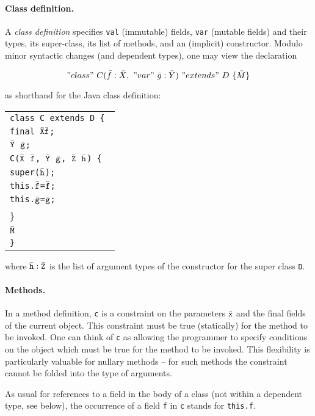 \documentclass[nocopyrightspace,preprint,10pt]{sigplanconf}
\begin{document}
\paragraph{Class definition.}

A {\em class definition} specifies {\tt val} (immutable) fields, {\tt var}
(mutable fields) and their types, its super-class, its list of
methods, and an (implicit) constructor. Modulo minor syntactic changes
(and dependent types), one may view the declaration

\[
"class"~C(\bar{f}:\bar{X},~"var"~\bar{g}:\bar{Y})~"extends"~D~\{\bar{M}\}
\]

\noindent as shorthand for the Java class definition:

{\footnotesize
\begin{tabular}[t]{l}
\tt class C extends D \{ \\
\tt  \quad final $\bar{\tt X} \bar{\tt f}$;\\
 \tt \quad $\bar{\tt Y}$\ $\bar{\tt g}$; \\
 \tt \quad C($\bar{\tt X}$\ $\bar{\tt f}$,\,$\bar{\tt Y}$\ $\bar{\tt g}$,\,$\bar{\tt Z}$\ $\bar{\tt h}$) \{\\
  \tt \quad\quad super($\bar{\tt h}$); \\
  \tt \quad\quad this.$\bar{\tt f}$=$\bar{\tt f}$;\\
  \tt \quad\quad this.$\bar{\tt g}$=$\bar{\tt g}$;\\
 \quad \} \\
\tt \quad $\bar{\tt M}$\\
\tt \}
\end{tabular}}

\noindent where $\bar{\tt h}:\bar{\tt Z}$ is the list of argument types of the
constructor for the super class {\tt D}. 

\paragraph{Methods.}
In a method definition, {\tt c} is a constraint on the parameters
$\bar{\tt x}$ and the final fields of the current object.  This
constraint must be true (statically) for the method to be invoked.
One can think of {\tt c} as allowing the programmer to specify
conditions on the object which must be true for the method to be
invoked. This flexibility is particularly valuable for nullary methods
-- for such methods the constraint cannot be folded into the type of
arguments.

As usual for references to a field in the body of a class (not within
a dependent type, see below), the occurrence of a field {\tt f} in
{\tt c} stands for {\tt this.f}.
\end{document}
